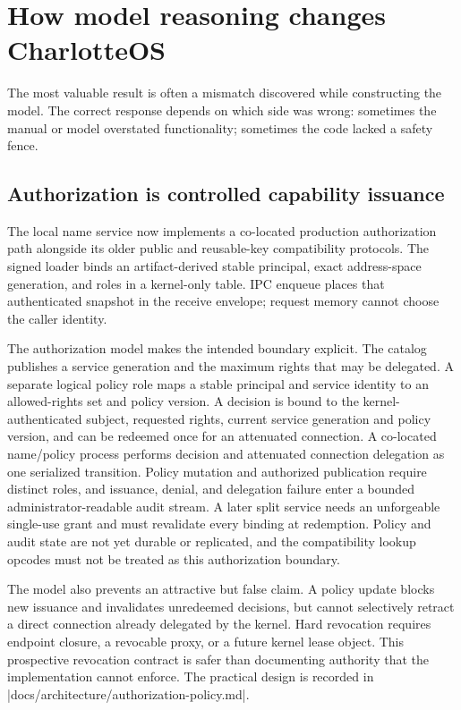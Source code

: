 \section[Model-driven findings]{How model reasoning changes CharlotteOS}

The most valuable result is often a mismatch discovered while constructing the
model. The correct response depends on which side was wrong: sometimes the
manual or model overstated functionality; sometimes the code lacked a safety
fence.

\subsection{Authorization is controlled capability issuance}

The local name service now implements a co-located production authorization
path alongside its older public and reusable-key compatibility protocols. The
signed loader binds an artifact-derived stable principal, exact address-space
generation, and roles in a kernel-only table. IPC enqueue places that
authenticated snapshot in the receive envelope; request memory cannot choose
the caller identity.

The authorization model makes the intended boundary explicit. The catalog
publishes a service generation and the maximum rights that may be delegated.
A separate logical policy role maps a stable principal and service identity to
an allowed-rights set and policy version. A decision is bound to the
kernel-authenticated subject, requested rights, current service generation and
policy version, and can be redeemed once for an attenuated connection. A
co-located name/policy process performs decision and attenuated connection
delegation as one serialized transition. Policy mutation and authorized
publication require distinct roles, and issuance, denial, and delegation
failure enter a bounded administrator-readable audit stream. A later split
service needs an unforgeable single-use grant and must revalidate every binding
at redemption. Policy and audit state are not yet durable or replicated, and
the compatibility lookup opcodes must not be treated as this authorization
boundary.

The model also prevents an attractive but false claim. A policy update blocks
new issuance and invalidates unredeemed decisions, but cannot selectively
retract a direct connection already delegated by the kernel. Hard revocation
requires endpoint closure, a revocable proxy, or a future kernel lease object.
This prospective revocation contract is safer than documenting authority that
the implementation cannot enforce. The practical design is recorded in
\repofile|docs/architecture/authorization-policy.md|.

